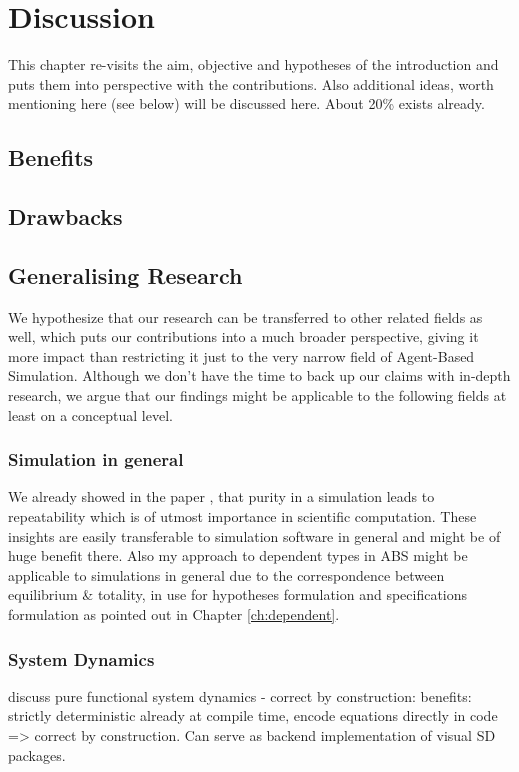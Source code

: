 \chapter{Discussion}
\label{ch:discussion}

This chapter re-visits the aim, objective and hypotheses of the introduction and puts them into perspective with the contributions. Also additional ideas, worth mentioning here (see below) will be discussed here. About 20\% exists already.

\section{Benefits}

\section{Drawbacks}

\section{Generalising Research}
We hypothesize that our research can be transferred to other related fields as well, which puts our contributions into a much broader perspective, giving it more impact than restricting it just to the very narrow field of Agent-Based Simulation. Although we don't have the time to back up our claims with in-depth research, we argue that our findings might be applicable to the following fields at least on a conceptual level.

\subsection{Simulation in general}
We already showed in the paper \cite{thaler_pure_2019}, that purity in a simulation leads to repeatability which is of utmost importance in scientific computation. These insights are easily transferable to simulation software in general and might be of huge benefit there. Also my approach to dependent types in ABS might be applicable to simulations in general due to the correspondence between equilibrium \& totality, in use for hypotheses formulation and specifications formulation as pointed out in Chapter \ref{ch:dependent}. 

\subsection{System Dynamics}
\label{sub:generalising_system_dynamics}
discuss pure functional system dynamics - correct by construction: benefits: strictly deterministic already at compile time, encode equations directly in code => correct by construction. Can serve as backend implementation of visual SD packages.

